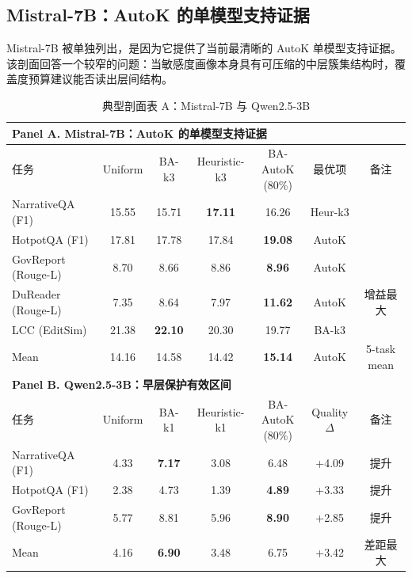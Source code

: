 \subsection{Mistral-7B：AutoK 的单模型支持证据}
\label{subsec:ch4-profile-mistral}
\label{subsec:exp-per-model-mistral}

Mistral-7B 被单独列出，是因为它提供了当前最清晰的 AutoK 单模型支持证据。该剖面回答一个较窄的问题：当敏感度画像本身具有可压缩的中层簇集结构时，覆盖度预算建议能否读出层间结构。

\begin{table}[H]
  \centering
  \caption{典型剖面表 A：Mistral-7B 与 Qwen2.5-3B}
  \label{tab:ch4-profile-a}
  \label{tab:t4-mistral-autok}
  \label{tab:t5-3b-early-layer}
  {%
  \footnotesize
  \setlength{\tabcolsep}{4pt}
  \renewcommand{\arraystretch}{1.05}
  \begin{tabular}{lcccccc}
    \toprule
    \multicolumn{7}{l}{\textbf{Panel A. Mistral-7B：AutoK 的单模型支持证据}} \\
    \midrule
    任务 & Uniform & BA-k3 & Heuristic-k3 & \makecell[c]{BA-AutoK\\(80\%)} & 最优项 & 备注 \\
    \midrule
    NarrativeQA (F1)    & 15.55 & 15.71 & \textbf{17.11} & 16.26 & Heur-k3 & \\
    HotpotQA (F1)       & 17.81 & 17.78 & 17.84 & \textbf{19.08} & AutoK & \\
    GovReport (Rouge-L) & 8.70  & 8.66  & 8.86 & \textbf{8.96}  & AutoK & \\
    DuReader (Rouge-L)  & 7.35  & 8.64  & 7.97 & \textbf{11.62} & AutoK & 增益最大 \\
    LCC (EditSim)       & 21.38 & \textbf{22.10} & 20.30 & 19.77 & BA-k3 & \\
    Mean                & 14.16 & 14.58 & 14.42 & \textbf{15.14} & AutoK & 5-task mean \\
    \midrule
    \multicolumn{7}{l}{\textbf{Panel B. Qwen2.5-3B：早层保护有效区间}} \\
    \midrule
    任务 & Uniform & BA-k1 & Heuristic-k1 & \makecell[c]{BA-AutoK\\(80\%)} & Quality $\Delta$ & 备注 \\
    \midrule
    NarrativeQA (F1)    & 4.33 & \textbf{7.17} & 3.08 & 6.48 & +4.09 & 提升 \\
    HotpotQA (F1)       & 2.38 & 4.73 & 1.39 & \textbf{4.89} & +3.33 & 提升 \\
    GovReport (Rouge-L) & 5.77 & 8.81 & 5.96 & \textbf{8.90} & +2.85 & 提升 \\
    Mean                & 4.16 & \textbf{6.90} & 3.48 & 6.75 & +3.42 & 差距最大 \\
    \bottomrule
  \end{tabular}

}
\end{table}
